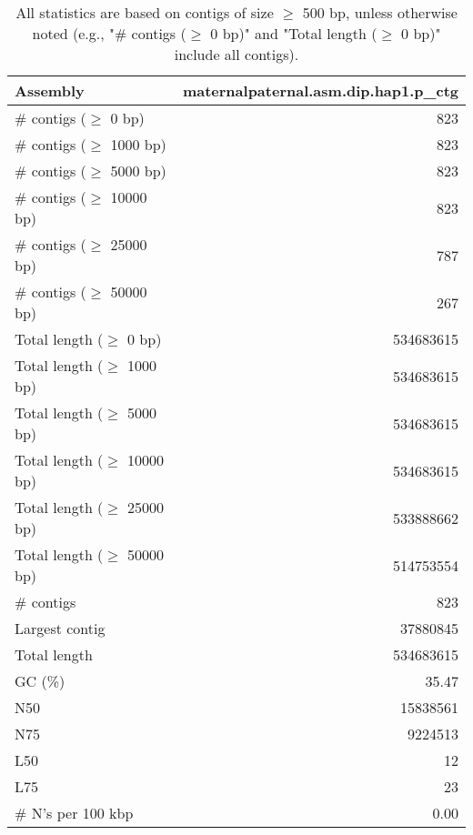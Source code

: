 \documentclass[12pt,a4paper]{article}
\begin{document}
\begin{table}[ht]
\begin{center}
\caption{All statistics are based on contigs of size $\geq$ 500 bp, unless otherwise noted (e.g., "\# contigs ($\geq$ 0 bp)" and "Total length ($\geq$ 0 bp)" include all contigs).}
\begin{tabular}{|l*{1}{|r}|}
\hline
Assembly & maternalpaternal.asm.dip.hap1.p\_ctg \\ \hline
\# contigs ($\geq$ 0 bp) & 823 \\ \hline
\# contigs ($\geq$ 1000 bp) & 823 \\ \hline
\# contigs ($\geq$ 5000 bp) & 823 \\ \hline
\# contigs ($\geq$ 10000 bp) & 823 \\ \hline
\# contigs ($\geq$ 25000 bp) & 787 \\ \hline
\# contigs ($\geq$ 50000 bp) & 267 \\ \hline
Total length ($\geq$ 0 bp) & 534683615 \\ \hline
Total length ($\geq$ 1000 bp) & 534683615 \\ \hline
Total length ($\geq$ 5000 bp) & 534683615 \\ \hline
Total length ($\geq$ 10000 bp) & 534683615 \\ \hline
Total length ($\geq$ 25000 bp) & 533888662 \\ \hline
Total length ($\geq$ 50000 bp) & 514753554 \\ \hline
\# contigs & 823 \\ \hline
Largest contig & 37880845 \\ \hline
Total length & 534683615 \\ \hline
GC (\%) & 35.47 \\ \hline
N50 & 15838561 \\ \hline
N75 & 9224513 \\ \hline
L50 & 12 \\ \hline
L75 & 23 \\ \hline
\# N's per 100 kbp & 0.00 \\ \hline
\end{tabular}
\end{center}
\end{table}
\end{document}
